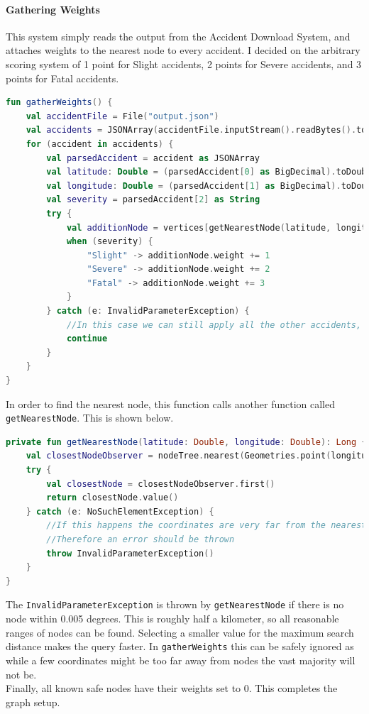 \documentclass[11pt,twoside,a4paper]{report}
\begin{document}
\paragraph{Gathering Weights}
This system simply reads the output from the Accident Download System, and attaches weights to the nearest node to every accident. I decided on the arbitrary scoring system of 1 point for Slight accidents, 2 points for Severe accidents, and 3 points for Fatal accidents. 
\begin{lstlisting}[language=kotlin]
fun gatherWeights() {
    val accidentFile = File("output.json")
    val accidents = JSONArray(accidentFile.inputStream().readBytes().toString(Charsets.UTF_8))
    for (accident in accidents) {
        val parsedAccident = accident as JSONArray
        val latitude: Double = (parsedAccident[0] as BigDecimal).toDouble()
        val longitude: Double = (parsedAccident[1] as BigDecimal).toDouble()
        val severity = parsedAccident[2] as String
        try {
            val additionNode = vertices[getNearestNode(latitude, longitude)]!!
            when (severity) {
                "Slight" -> additionNode.weight += 1
                "Severe" -> additionNode.weight += 2
                "Fatal" -> additionNode.weight += 3
            }
        } catch (e: InvalidParameterException) {
            //In this case we can still apply all the other accidents, even if this accident doesn't match well.
            continue
        }
    }
}
\end{lstlisting}
In order to find the nearest node, this function calls another function called \texttt{getNearestNode}. This is shown below.
\begin{lstlisting}[language=kotlin]
private fun getNearestNode(latitude: Double, longitude: Double): Long {
    val closestNodeObserver = nodeTree.nearest(Geometries.point(longitude, latitude), 0.005, 1)
    try {
        val closestNode = closestNodeObserver.first()
        return closestNode.value()
    } catch (e: NoSuchElementException) {
        //If this happens the coordinates are very far from the nearest node, so a appropriate node cannot be found.
        //Therefore an error should be thrown
        throw InvalidParameterException()
    }
}
\end{lstlisting}
The \texttt{InvalidParameterException} is thrown by \texttt{getNearestNode} if there is no node within 0.005 degrees. This is roughly half a kilometer, so all reasonable ranges of nodes can be found. Selecting a smaller value for
 the maximum search distance makes the query faster. In \texttt{gatherWeights} this can be safely ignored as while a few coordinates might be too far away from nodes the vast majority will not be.\\
Finally, all known safe nodes have their weights set to 0. This completes the graph setup.
\end{document}
